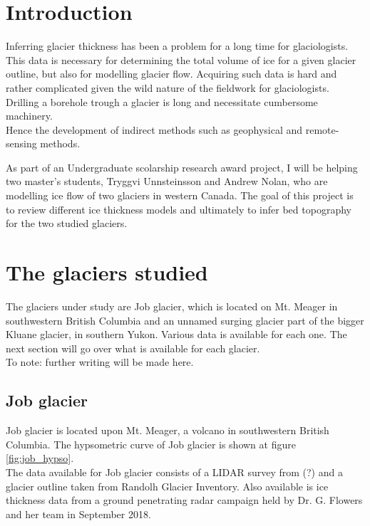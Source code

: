 \documentclass[a4, 12pt]{article}
\begin{document}
\section{Introduction}
Inferring glacier thickness has been a problem for a long time for glaciologists. This data is necessary for determining the total volume of ice for a given glacier outline, but also for modelling glacier flow.
Acquiring such data is hard and rather complicated given the wild nature of the fieldwork for glaciologists. Drilling a borehole trough a glacier is long and necessitate cumbersome machinery.\\

Hence the development of indirect methods such as geophysical and remote-sensing methods.

As part of an Undergraduate scolarship research award project, I will be helping two master's students, Tryggvi Unnsteinsson and Andrew Nolan, who are modelling ice flow of two glaciers in western Canada. The goal of this project is to review different ice thickness models and ultimately to infer bed topography for the two studied glaciers.

\section{The glaciers studied}

The glaciers under study are Job glacier, which is located on Mt. Meager in southwestern British Columbia  and an unnamed surging glacier part of the bigger Kluane glacier, in southern Yukon. Various data is available for each one. The next section will go over what is available for each glacier.\\

To note: further writing will be made here.

\subsection{Job glacier}
Job glacier is located upon Mt. Meager, a volcano in southwestern British Columbia. The hypsometric curve of Job glacier is shown at figure \ref{fig:job_hypso}.\\
The data available for Job glacier consists of a LIDAR survey from (?) and a glacier outline taken from Randolh Glacier Inventory. Also available is ice thickness data from a ground penetrating radar campaign held by Dr. G. Flowers and her team in September 2018. 
\end{document}
